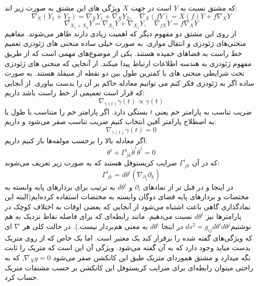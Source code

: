 که مشتق نسبت به $Y$ است در جهت $X$ ویژگی های این مشتق به صورت زیر اند:
\begin{equation}
    \nabla_X(Y_1+Y_2)=\nabla_X Y_1+\nabla_X Y_2,\quad \nabla_X(fY)=X(f) Y+f\nabla_X Y
\end{equation}
\begin{equation}
    \nabla_{X_1+X_2}Y=\nabla_{X_1} Y+\nabla_{X_2} Y,\quad \nabla_{f X}Y=f \nabla_X Y
\end{equation}
از روی این مشتق دو مفهوم دیگر که اهمیت زیادی دارند ظاهر می‌شوند. مفاهیم منحنی‌های ژئودزی و انتقال موازی. به صورت خیلی ساده منحنی های ژئودزی تعمیم خط راست به فضاهای خمیده هستند.  یکی از موضوع‌های مهمی است که از طریق مفهوم ژئودزی به هندسه اطلاعات ارتباط پیدا میکند. از آنجایی که منحنی های ژئودزی تحت شرایطی منحنی های با کمترین طول بین دو نقطه از منیفلد هستند. به صورت ساده اگر به ژئودزی فکر کنم می توانیم معادله حاکم بر آن را بدست بیاوری. از آنجایی که قرار است تعمیمی از خط راست باشد داریم:
\begin{equation}
    \nabla_{\dot{\gamma}(t)}\dot{\gamma}(t)\propto \dot{\gamma}(t)
\end{equation}
ضریب تناسب به پارامتر خم یعنی $t$ بستگی دارد. اگر پارامتر خم را متناسب با طول یا به اصطلاح پارامتر آفین انتخاب کنیم ضریب تناسب صفر می‌شود و داریم:
\begin{equation}
    \nabla_{\dot{\gamma}(t)}\dot{\gamma}(t)=0
\end{equation}
اگر معادله بالا را برحسب مولفه‌ها باز کنیم داریم:
\begin{equation}
    \ddot{\theta^i}+\Gamma^i_{\ jk}\dot{\theta}^i\dot{\theta}^j=0
\end{equation}
که در آن $\Gamma^i_{\ jk}$ ضرایب کریستوفل هستند که به صورت زیر تعریف می‌شوند:
\begin{equation}
    \Gamma^i_{\ jk}=d\theta^i(\nabla_{\partial_j}\partial_k)
\end{equation}
در اینجا و در قبل تر از نمادهای $\partial_i$ و $d\theta^i$ به ترتیب برای بردارهای پایه وابسته به مختصات و بردارهای پایه فضای دوگان وابسته به مختصات استفاده کرده‌ایم(البته این نمادگذاری گاهی باعث اشتباه می‌شود از آنجایی که بعضی اوقات به اختلاف کوچک در پارامترها نیز $d\theta^i$ نسبت می‌دهیم. مانند رابطه‌ای که برای فاصله نقاط نزدیک به هم نوشتیم$ds^2=g_{ij}d\theta^i d\theta^j$ در اینجا $d\theta^i$ به معنی هم‌بردار نیست.). در حالت کلی هر $\nabla$ ای که ویژگی‌های گفته شده را برقرار کند یک  معتبر است. اما یک  خاص که از روی متریک بدست میاید وجود دارد که به آن  گفته می‌شود. ویژگی آن این است که متریک را ثابت نگه میدارد و مشتق هموردای متریک طبق این کانکشن صفر می‌شود $\nabla_X g=0$, که به راحتی میتوان رابطه‌ای برای ضرایب کریستوفل این کانکشن بر حسب مشتقات متریک حساب کرد.\\

